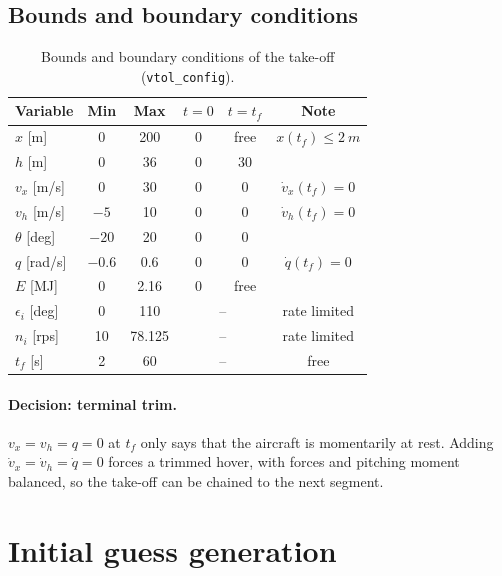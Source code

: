 \documentclass[11pt,a4paper]{article}
\newcommand{\code}[1]{\texttt{\small #1}}
\begin{document}
\subsection{Bounds and boundary conditions}
\begin{table}[h]
\centering\small
\begin{tabular}{@{}lccccc@{}}
\toprule
Variable & Min & Max & $t=0$ & $t=t_f$ & Note \\
\midrule
$x$ [m]          & 0     & 200 & 0 & free & $x(t_f) \le \SI{2}{m}$ \\
$h$ [m]          & 0     & 36  & 0 & 30   & \\
$v_x$ [m/s]      & 0     & 30  & 0 & 0    & $\dot v_x(t_f) = 0$ \\
$v_h$ [m/s]      & $-5$  & 10  & 0 & 0    & $\dot v_h(t_f) = 0$ \\
$\theta$ [deg]   & $-20$ & 20  & 0 & 0    & \\
$q$ [rad/s]      & $-0.6$& 0.6 & 0 & 0    & $\dot q(t_f) = 0$ \\
$E$ [MJ]         & 0     & 2.16& 0 & free & \\
\midrule
$\epsilon_i$ [deg] & 0 & 110 & \multicolumn{2}{c}{--} & rate limited \\
$n_i$ [rps]        & 10 & 78.125 & \multicolumn{2}{c}{--} & rate limited \\
$t_f$ [s]          & 2 & 60 & \multicolumn{2}{c}{--} & free \\
\bottomrule
\end{tabular}
\caption{Bounds and boundary conditions of the take-off (\code{vtol\_config}).}
\end{table}

\paragraph{Decision: terminal trim.} $v_x = v_h = q = 0$ at $t_f$ only says that the aircraft is
momentarily at rest. Adding $\dot v_x = \dot v_h = \dot q = 0$ forces a trimmed hover, with forces and
pitching moment balanced, so the take-off can be chained to the next segment.

\section{Initial guess generation}\label{sec:guess}
\end{document}
